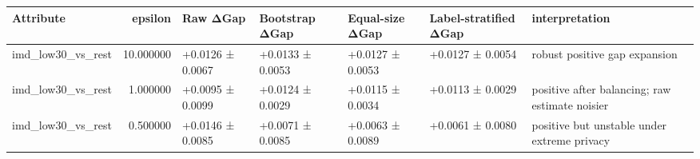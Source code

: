 \begin{tabular}{lrlllll}
\toprule
Attribute & epsilon & Raw ΔGap & Bootstrap ΔGap & Equal-size ΔGap & Label-stratified ΔGap & interpretation \\
\midrule
imd_low30_vs_rest & 10.000000 & +0.0126 ± 0.0067 & +0.0133 ± 0.0053 & +0.0127 ± 0.0053 & +0.0127 ± 0.0054 & robust positive gap expansion \\
imd_low30_vs_rest & 1.000000 & +0.0095 ± 0.0099 & +0.0124 ± 0.0029 & +0.0115 ± 0.0034 & +0.0113 ± 0.0029 & positive after balancing; raw estimate noisier \\
imd_low30_vs_rest & 0.500000 & +0.0146 ± 0.0085 & +0.0071 ± 0.0085 & +0.0063 ± 0.0089 & +0.0061 ± 0.0080 & positive but unstable under extreme privacy \\
\bottomrule
\end{tabular}
